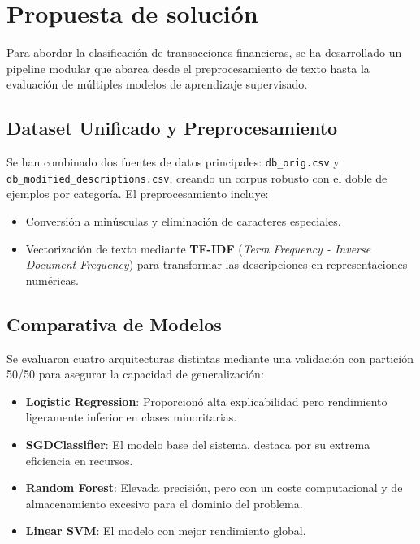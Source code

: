 \section{Propuesta de solución}
\label{sec:propuesta}

Para abordar la clasificación de transacciones financieras, se ha desarrollado un pipeline modular que abarca desde el preprocesamiento de texto hasta la evaluación de múltiples modelos de aprendizaje supervisado.

\subsection{Dataset Unificado y Preprocesamiento}
Se han combinado dos fuentes de datos principales: \texttt{db\_orig.csv} y \texttt{db\_modified\_descriptions.csv}, creando un corpus robusto con el doble de ejemplos por categoría. El preprocesamiento incluye:
\begin{itemize}
    \item Conversión a minúsculas y eliminación de caracteres especiales.
    \item Vectorización de texto mediante \textbf{TF-IDF} (\textit{Term Frequency - Inverse Document Frequency}) para transformar las descripciones en representaciones numéricas.
\end{itemize}

\subsection{Comparativa de Modelos}
Se evaluaron cuatro arquitecturas distintas mediante una validación con partición 50/50 para asegurar la capacidad de generalización:
\begin{itemize}
    \item \textbf{Logistic Regression}: Proporcionó alta explicabilidad pero rendimiento ligeramente inferior en clases minoritarias.
    \item \textbf{SGDClassifier}: El modelo base del sistema, destaca por su extrema eficiencia en recursos.
    \item \textbf{Random Forest}: Elevada precisión, pero con un coste computacional y de almacenamiento excesivo para el dominio del problema.
    \item \textbf{Linear SVM}: El modelo con mejor rendimiento global.
\end{itemize}

